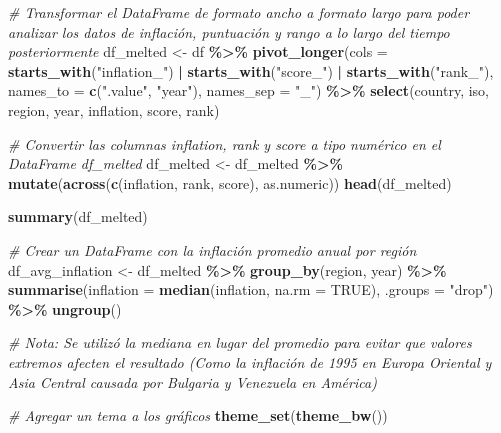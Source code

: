 \documentclass[
]{article}
\newenvironment{Shaded}{\begin{snugshade}}{\end{snugshade}}
\newcommand{\AttributeTok}[1]{\textcolor[rgb]{0.13,0.29,0.53}{#1}}
\newcommand{\CommentTok}[1]{\textcolor[rgb]{0.56,0.35,0.01}{\textit{#1}}}
\newcommand{\ConstantTok}[1]{\textcolor[rgb]{0.56,0.35,0.01}{#1}}
\newcommand{\FunctionTok}[1]{\textcolor[rgb]{0.13,0.29,0.53}{\textbf{#1}}}
\newcommand{\NormalTok}[1]{#1}
\newcommand{\OtherTok}[1]{\textcolor[rgb]{0.56,0.35,0.01}{#1}}
\newcommand{\SpecialCharTok}[1]{\textcolor[rgb]{0.81,0.36,0.00}{\textbf{#1}}}
\newcommand{\StringTok}[1]{\textcolor[rgb]{0.31,0.60,0.02}{#1}}
\begin{document}
\begin{Shaded}
\begin{Highlighting}[]
\CommentTok{\# Transformar el DataFrame de formato ancho a formato largo para poder analizar los datos de inflación, puntuación y rango a lo largo del tiempo posteriormente}
\NormalTok{df\_melted }\OtherTok{\textless{}{-}}\NormalTok{ df }\SpecialCharTok{\%\textgreater{}\%}
  \FunctionTok{pivot\_longer}\NormalTok{(}\AttributeTok{cols =} \FunctionTok{starts\_with}\NormalTok{(}\StringTok{"inflation\_"}\NormalTok{) }\SpecialCharTok{|} \FunctionTok{starts\_with}\NormalTok{(}\StringTok{"score\_"}\NormalTok{) }\SpecialCharTok{|} \FunctionTok{starts\_with}\NormalTok{(}\StringTok{"rank\_"}\NormalTok{),}
  \AttributeTok{names\_to =} \FunctionTok{c}\NormalTok{(}\StringTok{".value"}\NormalTok{, }\StringTok{"year"}\NormalTok{),}
  \AttributeTok{names\_sep =} \StringTok{"\_"}\NormalTok{) }\SpecialCharTok{\%\textgreater{}\%}
\FunctionTok{select}\NormalTok{(country, iso, region, year, inflation, score, rank)}

\CommentTok{\# Convertir las columnas \textquotesingle{}inflation\textquotesingle{}, \textquotesingle{}rank\textquotesingle{} y \textquotesingle{}score\textquotesingle{} a tipo numérico en el DataFrame df\_melted}
\NormalTok{df\_melted }\OtherTok{\textless{}{-}}\NormalTok{ df\_melted }\SpecialCharTok{\%\textgreater{}\%}
    \FunctionTok{mutate}\NormalTok{(}\FunctionTok{across}\NormalTok{(}\FunctionTok{c}\NormalTok{(inflation, rank, score), as.numeric))}
\FunctionTok{head}\NormalTok{(df\_melted)}

\FunctionTok{summary}\NormalTok{(df\_melted)}

\CommentTok{\# Crear un DataFrame con la inflación promedio anual por región}
\NormalTok{df\_avg\_inflation }\OtherTok{\textless{}{-}}\NormalTok{ df\_melted }\SpecialCharTok{\%\textgreater{}\%}
    \FunctionTok{group\_by}\NormalTok{(region, year) }\SpecialCharTok{\%\textgreater{}\%}
    \FunctionTok{summarise}\NormalTok{(}\AttributeTok{inflation =} \FunctionTok{median}\NormalTok{(inflation, }\AttributeTok{na.rm =} \ConstantTok{TRUE}\NormalTok{), }\AttributeTok{.groups =} \StringTok{"drop"}\NormalTok{) }\SpecialCharTok{\%\textgreater{}\%}
    \FunctionTok{ungroup}\NormalTok{()}

\CommentTok{\# Nota: Se utilizó la mediana en lugar del promedio para evitar que valores extremos afecten el resultado (Como la inflación de 1995 en Europa Oriental y Asia Central causada por Bulgaria y Venezuela en América)}

\CommentTok{\# Agregar un tema a los gráficos}
\FunctionTok{theme\_set}\NormalTok{(}\FunctionTok{theme\_bw}\NormalTok{())}


\end{Highlighting}
\end{Shaded}
\end{document}
